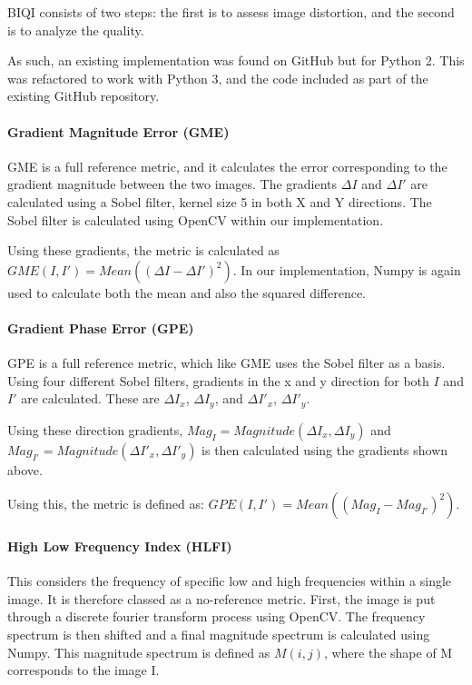 \documentclass[10pt,a4paper]{article}
\begin{document}
                BIQI consists of two steps: the first is to assess image distortion, and the second is to analyze the quality. 

                As such, an existing implementation was found on GitHub but for Python 2. \cite{BIQIImplementation} This was refactored to work with Python 3, and the code included as part
                of the existing GitHub repository. 

                
            \paragraph{Gradient Magnitude Error (GME)}
                GME is a full reference metric, and it calculates the error corresponding to the gradient magnitude between the two images. The gradients $\Delta I$ and $\Delta I'$
                are calculated using a Sobel filter, kernel size 5 in both X and Y directions. The Sobel filter is calculated using OpenCV within our implementation.

                Using these gradients, the metric is calculated as $GME(I, I') = Mean((\Delta I - \Delta I')^2)$. In our implementation, Numpy is again used to calculate both the mean and
                also the squared difference.

            \paragraph{Gradient Phase Error (GPE)}
                GPE is a full reference metric, which like GME uses the Sobel filter as a basis. Using four different Sobel filters, gradients in the x and y direction for both
                $I$ and $I'$ are calculated. These are $\Delta I_x$, $\Delta I_y$, and $\Delta I'_x$, $\Delta I'_y$.

                Using these direction gradients, $Mag_{I} = Magnitude(\Delta I_x, \Delta I_y)$ and $Mag_{I'} = Magnitude(\Delta I'_x, \Delta I'_y)$ is then calculated using the gradients shown above.

                Using this, the metric is defined as: $GPE(I, I') = Mean((Mag_{I} - Mag_{I'})^2)$.

            \paragraph{High Low Frequency Index (HLFI)}
                This considers the frequency of specific low and high frequencies within a single image. It is therefore classed as a no-reference metric.
                First, the image is put through a discrete fourier transform process using OpenCV. The frequency spectrum is then shifted and a final magnitude spectrum
                is calculated using Numpy. This magnitude spectrum is defined as $M(i, j)$, where the shape of M corresponds to the image I.
\end{document}
